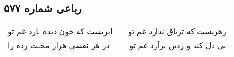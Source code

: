 \begin{center}
\section*{رباعی شماره ۵۷۷}
\label{sec:sh577}
\begin{longtable}{l p{0.5cm} r}
ابریست که خون دیده بارد غم تو
&&
زهریست که تریاق ندارد غم تو
\\
در هر نفسی هزار محنت زده را
&&
بی دل کند و زدین برآرد غم تو
\\
\end{longtable}
\end{center}
